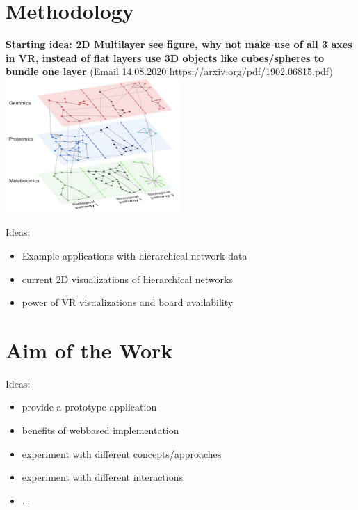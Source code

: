  \section{Methodology}
 \textbf{Starting idea: 2D Multilayer see figure, why not make use of all 3 axes in VR, instead of flat layers use 3D objects like cubes/spheres to bundle one layer} (Email 14.08.2020 https://arxiv.org/pdf/1902.06815.pdf)
 \includegraphics[width=0.5\textwidth]{chapters/graphics/2dmultilayerVis.jpg}
 
 Ideas:
 \begin{itemize}
     \item Example applications with hierarchical network data
     \item current 2D visualizations of hierarchical networks
     \item power of VR visualizations and board availability
 \end{itemize}

\section{Aim of the Work}

Ideas:
\begin{itemize}
    \item provide a prototype application
    \item benefits of webbased implementation 
    \item experiment with different concepts/approaches
    \item experiment with different interactions
    \item ...
\end{itemize}

